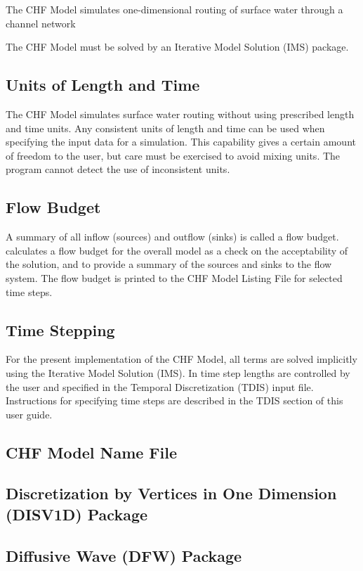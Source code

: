 The CHF Model simulates one-dimensional routing of surface water through a channel network

The CHF Model must be solved by an Iterative Model Solution (IMS) package.

\subsection{Units of Length and Time}
The CHF Model simulates surface water routing without using prescribed length and time units. Any consistent units of length and time can be used when specifying the input data for a simulation. This capability gives a certain amount of freedom to the user, but care must be exercised to avoid mixing units.  The program cannot detect the use of inconsistent units.

\subsection{Flow Budget}
A summary of all inflow (sources) and outflow (sinks) is called a flow budget.  \mf calculates a flow budget for the overall model as a check on the acceptability of the solution, and to provide a summary of the sources and sinks to the flow system.  The flow budget is printed to the CHF Model Listing File for selected time steps.

\subsection{Time Stepping}

For the present implementation of the CHF Model, all terms are solved implicitly using the Iterative Model Solution (IMS).  In \mf time step lengths are controlled by the user and specified in the Temporal Discretization (TDIS) input file.  Instructions for specifying time steps are described in the TDIS section of this user guide.  

\newpage
\subsection{CHF Model Name File}


\newpage
\subsection{Discretization by Vertices in One Dimension (DISV1D) Package}


\newpage
\subsection{Diffusive Wave (DFW) Package}


